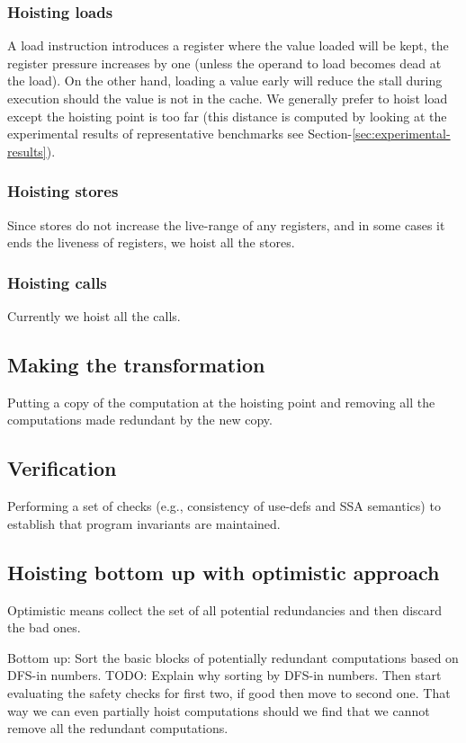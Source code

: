 \documentclass{sig-alternate}
\begin{document}
\subsubsection{Hoisting loads}
A load instruction introduces a register where the value loaded will be kept,
the register pressure increases by one (unless the operand to load becomes dead
at the load). On the other hand, loading a value early will reduce the stall
during execution should the value is not in the cache. We generally prefer to
hoist load except the hoisting point is too far (this distance is computed by
looking at the experimental results of representative benchmarks see
Section-\ref{sec:experimental-results}).

\subsubsection{Hoisting stores}
Since stores do not increase the live-range of any registers, and in some cases
it ends the liveness of registers, we hoist all the stores.

\subsubsection{Hoisting calls}
Currently we hoist all the calls.

\subsection{Making the transformation}
Putting a copy of the computation at the hoisting point and removing all the
computations made redundant by the new copy.

\subsection{Verification}
Performing a set of checks (e.g., consistency of use-defs and SSA semantics) to
establish that program invariants are maintained.

\subsection{Hoisting bottom up with optimistic approach}
\label{subsec:optimistic}
Optimistic means collect the set of all potential redundancies and
then discard the bad ones.

Bottom up: Sort the basic blocks of potentially redundant computations
based on DFS-in numbers.  TODO: Explain why sorting by DFS-in numbers.
Then start evaluating the safety checks for first two, if good then
move to second one. That way we can even partially hoist computations
should we find that we cannot remove all the redundant computations.
\end{document}
